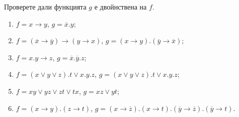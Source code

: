 \begin{problem} %
  Проверете дали функцията $g$ е двойнствена на $f$.
  \begin{enumerate}[1)]
  \item
    $f = x\rightarrow y$, $g = \overline{x}.y$;
  \item
    $f = (\overline{x}\rightarrow\overline{y})\rightarrow(y\rightarrow x)$, $g = (x\rightarrow y).(\overline{y}\rightarrow\overline{x})$;
  \item
    $f = x.y \rightarrow z$, $g = \overline{x}.\overline{y}.z$;
  \item
    $f = (x\vee y\vee z).t\vee x.y.z$, $g = (x\vee y\vee z).t\vee x.y.z$;
  \item
    $f = xy\vee yz\vee zt\vee tx$, $g = xz\vee yt$;
  \item
    $f = (x\rightarrow y).(z\rightarrow t)$, $g = (x\rightarrow\overline{z}).(x\rightarrow t).(\overline{y}\rightarrow\overline{z}).(\overline{y}\rightarrow t)$.
  \end{enumerate}
\end{problem}

